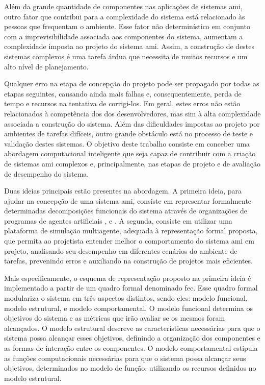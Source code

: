     Além da grande quantidade de componentes nas aplicações de sistemas \acrshort{ami}, outro fator que contribui para a complexidade do sistema está relacionado às pessoas que frequentam o ambiente. Esse fator não determinístico em conjunto com a imprevisibilidade associada aos componentes do sistema, aumentam a complexidade imposta ao projeto do sistema \acrshort{ami}. Assim, a construção de destes sistemas complexos é uma tarefa árdua que necessita de muitos recursos e um alto nível de planejamento. 
    
    Qualquer erro na etapa de concepção do projeto pode ser propagado por todas as etapas seguintes, causando ainda mais falhas e, consequentemente, perda de tempo e recursos na tentativa de corrigi-los. Em geral, estes erros não estão relacionados à competência dos dos desenvolvedores, mas sim à alta complexidade associada a construção do sistema. Além das dificuldades impostas ao projeto por ambientes de tarefas difíceis, outro grande obstáculo está no processo de teste e validação destes sistemas. O objetivo deste trabalho consiste em conceber uma abordagem computacional inteligente que seja capaz de contribuir com a criação de sistemas \acrshort{ami} complexos e, principalmente, nas etapas de projeto e de avaliação de desempenho do sistema.
    
    Duas ideias principais estão presentes na abordagem. A primeira ideia, para ajudar na concepção de uma sistema \acrshort{ami}, consiste em representar formalmente determinadas decomposições funcionais do sistema  através de organizações de programas de agentes artificiais ,  e . A segunda, consiste em utilizar uma plataforma de simulação multiagente, adequada à representação formal proposta, que permita ao projetista entender melhor o comportamento do sistema \acrshort{ami} em projeto, analisando seu desempenho em diferentes cenários do ambiente de tarefas, prevenindo erros e auxiliando na construção de projetos mais eficientes.
    
    Mais especificamente, o esquema de representação proposto na primeira ideia é implementado a partir de um quadro formal denominado \acrshort{fec}. Esse quadro formal modulariza o sistema em três aspectos distintos, sendo eles: modelo funcional, modelo estrutural, e modelo comportamental. O modelo funcional determina os objetivos do sistema e as métricas que irão avaliar se os mesmos foram alcançados. O modelo estrutural descreve as características necessárias para que o sistema possa alcançar esses objetivos, definindo a organização dos componentes e as formas de interação entre os componentes. O modelo comportamental estipula as funções computacionais necessárias para que o sistema possa alcançar seus objetivos, determinados no modelo de função, utilizando os recursos definidos no modelo estrutural. 
    
